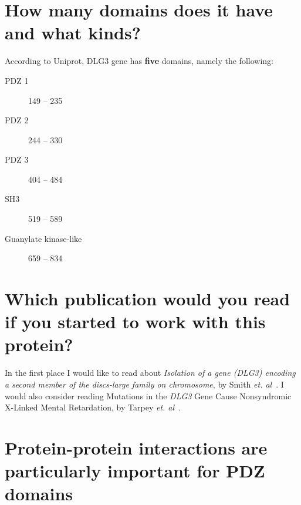 \clearpage
\section{How many domains does it have and what kinds?}
According to Uniprot, DLG3 gene has \textbf{five} domains, namely the following:
\begin{description}
\item[PDZ 1] 149 – 235
\item[PDZ 2] 244 – 330
\item[PDZ 3] 404 – 484	
\item[SH3] 519 – 589
\item[Guanylate kinase-like] 659 – 834	
\end{description}

\section{Which publication would you read if you started to work with this protein?}

In the first place I would like to read about \emph{Isolation of a gene (DLG3) encoding a second member of the discs-large family on chromosome}, by Smith \emph{et. al}~\cite{smith1996isolation}.
I would also consider reading Mutations in the \emph{DLG3} Gene Cause Nonsyndromic X-Linked Mental Retardation, by Tarpey \emph{et. al}~\cite{tarpey2004mutations}.

\section{Protein-protein interactions are particularly important for PDZ domains}

